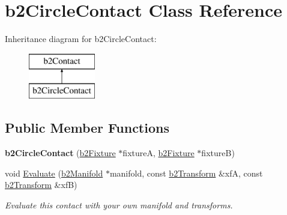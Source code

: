 \hypertarget{classb2_circle_contact}{\section{b2\-Circle\-Contact Class Reference}
\label{classb2_circle_contact}
}
Inheritance diagram for b2\-Circle\-Contact\-:\begin{figure}[H]
\begin{center}
\leavevmode
\includegraphics[height=2.000000cm]{classb2_circle_contact}
\end{center}
\end{figure}
\subsection*{Public Member Functions}
\begin{DoxyCompactItemize}
\item 
\hypertarget{classb2_circle_contact_a77e06c857edb2ca171340898f09ef789}{{\bfseries b2\-Circle\-Contact} (\hyperlink{classb2_fixture}{b2\-Fixture} $\ast$fixture\-A, \hyperlink{classb2_fixture}{b2\-Fixture} $\ast$fixture\-B)}\label{classb2_circle_contact_a77e06c857edb2ca171340898f09ef789}

\item 
\hypertarget{classb2_circle_contact_ac0651dda773561b8561b8efa3cd31d5c}{void \hyperlink{classb2_circle_contact_ac0651dda773561b8561b8efa3cd31d5c}{Evaluate} (\hyperlink{structb2_manifold}{b2\-Manifold} $\ast$manifold, const \hyperlink{structb2_transform}{b2\-Transform} \&xf\-A, const \hyperlink{structb2_transform}{b2\-Transform} \&xf\-B)}\label{classb2_circle_contact_ac0651dda773561b8561b8efa3cd31d5c}

\begin{DoxyCompactList}\small\item\em Evaluate this contact with your own manifold and transforms. \end{DoxyCompactList}\end{DoxyCompactItemize}
